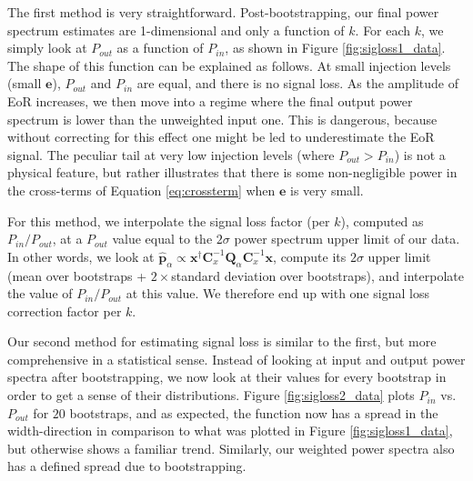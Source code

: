 \documentclass[preprint2,numberedappendix,tighten]{aastex6}  %
\newcommand{\cc}[1]{{\color{purple} \textbf{[CC: #1]}}}
\begin{document}
The first method is very straightforward. Post-bootstrapping, our final power spectrum estimates are 1-dimensional and only a function of $k$. For each $k$, we simply look at $P_{out}$ as a function of $P_{in}$, as shown in Figure \ref{fig:sigloss1_data}. The shape of this function can be explained as follows. At small injection levels (small $\textbf{e}$), $P_{out}$ and $P_{in}$ are equal, and there is no signal loss. As the amplitude of EoR increases, we then move into a regime where the final output power spectrum is lower than the unweighted input one. This is dangerous, because without correcting for this effect one might be led to underestimate the EoR signal. The peculiar tail at very low injection levels (where $P_{out} > P_{in}$) is not a physical feature, but rather illustrates that there is some non-negligible power in the cross-terms of Equation \ref{eq:crossterm} when $\textbf{e}$ is very small.

For this method, we interpolate the signal loss factor (per $k$), computed as $P_{in}/P_{out}$, at a $P_{out}$ value equal to the $2\sigma$ power spectrum upper limit of our data. In other words, we look at $\hat{\textbf{p}}_{\alpha} \propto \textbf{x}^{\dagger}\textbf{C}_{x}^{-1}\textbf{Q}_{\alpha}\textbf{C}_{x}^{-1}\textbf{x}$, compute its $2\sigma$ upper limit (mean over bootstraps + $2 \times $standard deviation over bootstraps), and interpolate the value of $P_{in}/P_{out}$ at this value. We therefore end up with one signal loss correction factor per $k$. 


Our second method for estimating signal loss is similar to the first, but more comprehensive in a statistical sense. Instead of looking at input and output power spectra after bootstrapping, we now look at their values for every bootstrap in order to get a sense of their distributions. Figure \ref{fig:sigloss2_data} plots $P_{in}$ vs. $P_{out}$ for $20$ bootstraps, and as expected, the function now has a spread in the width-direction in comparison to what was plotted in Figure \ref{fig:sigloss1_data}, but otherwise shows a familiar trend. Similarly, our weighted power spectra also has a defined spread due to bootstrapping.
\end{document}
